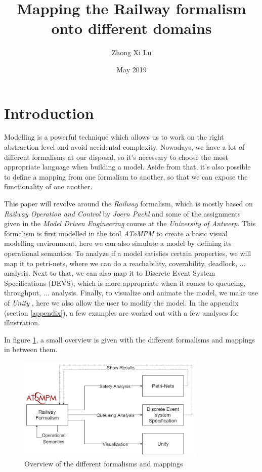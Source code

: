 \documentclass{article}
\title{Mapping the Railway formalism onto different domains}
\author{Zhong Xi Lu}
\affil{\small Department of Mathematics \\ and Computer Science \\ University of Antwerp, Belgium \\ \email{zhong-xi.lu@student.uantwerpen.be}}
\date{May 2019}
\begin{document}
\maketitle

\section{Introduction}

Modelling is a powerful technique which allows us to work on the right abstraction level and avoid accidental complexity. Nowadays, we have a lot of different formalisms at our disposal, so it's necessary to choose the most appropriate language when building a model. Aside from that, it's also possible to define a mapping from one formalism to another, so that we can expose the functionality of one another.

This paper will revolve around the \textit{Railway} formalism, which is mostly based on \textit{Railway Operation and Control} \cite{railway_book} by \textit{Joern Pachl} and some of the assignments \cite{assignments} given in the \textit{Model Driven Engineering} course at the \textit{University of Antwerp}. This formalism is first modelled in the tool \textit{AToMPM} \cite{atompm} to create a basic visual modelling environment, here we can also simulate a model by defining its operational semantics. To analyze if a model satisfies certain properties, we will map it to petri-nets, where we can do a reachability, coverability, deadlock, ... analysis. Next to that, we can also map it to Discrete Event System Specifications (DEVS), which is more appropriate when it comes to queueing, throughput, ... analysis. Finally, to visualize and animate the model, we make use of \textit{Unity} \cite{unity}, here we also allow the user to modify the model. In the appendix (section \ref{appendix}), a few examples are worked out with a few analyses for illustration.

In figure \ref{overview}, a small overview is given with the different formalisms and mappings in between them.

\begin{figure}[H]
    \centering
    \includegraphics[width=0.8\textwidth]{images/overview.png}
    \caption{Overview of the different formalisms and mappings}
    \label{overview}
\end{figure}
\end{document}
